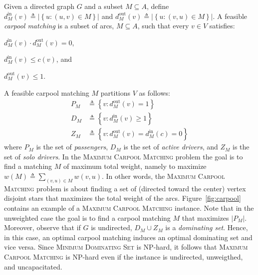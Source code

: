 \documentclass[11pt]{article}
\newcommand{\set}[1]{\left\{ #1 \right\}}
\newcommand{\abs}[1]{\left| #1 \right|}
\newcommand{\eqdf}{\triangleq}
\newcommand{\din}[1][M]{d^{\text{in}}_{#1}}
\newcommand{\dout}[1][M]{d^{\text{out}}_{#1}}
\newcommand{\carpool}{\textsc{Maximum Carpool Matching}\xspace}
\begin{document}
Given a directed graph $G$ and a subset $M \subseteq A$, define
\(
\din[M](v) \eqdf \abs{\set{u :(u,v) \in M}}
\)
and
\(
\dout[M](v) \eqdf \abs{\set{u :(v,u) \in M}}
\).
%
A feasible \emph{carpool matching} is a subset of arcs, $M \subseteq
A$, such that every $v \in V$ satisfies:%
\begin{inparaenum}[(i)]
\item $\din[M](v) \cdot \dout[M](v) = 0$,
\item $\din[M](v) \leq c(v)$, and 
\item $\dout[M](v) \leq 1$.
\end{inparaenum}
A feasible carpool matching $M$ partitions $V$ as follows:
\begin{align*}
P_M & \eqdf \set{v : \dout[M](v) = 1} \\
D_M & \eqdf \set{v : \din[M](v) \geq 1} \\
Z_M & \eqdf \set{v : \dout[M](v) = \din[M](c) = 0}
\end{align*}
where $P_M$ is the set of \emph{passengers}, $D_M$ is the set of
\emph{active drivers}, and $Z_M$ is the set of \emph{solo drivers}.
%
In the \carpool problem the goal is to find a matching $M$ of maximum
total weight, namely to maximize $w(M) \eqdf \sum_{(v,u) \in M}
w(v,u)$.  In other words, the \carpool problem is about finding a set
of (directed toward the center) vertex disjoint stars that maximizes
the total weight of the arcs.  
%
Figure~\ref{fig:carpool} contains an example of a \carpool instance.
%
Note that in the unweighted case the goal is to find a carpool
matching $M$ that maximizes $\abs{P_M}$.
%
Moreover, observe that if $G$ is undirected, $D_M \cup Z_M$ is
a \emph{dominating set}.  Hence, in this case, an optimal carpool
matching induces an optimal dominating set and vice versa.
Since \textsc{Minimum Dominating Set} is NP-hard, it follows
that \carpool is NP-hard even if the instance is undirected,
unweigthed, and uncapacitated.
\end{document}
